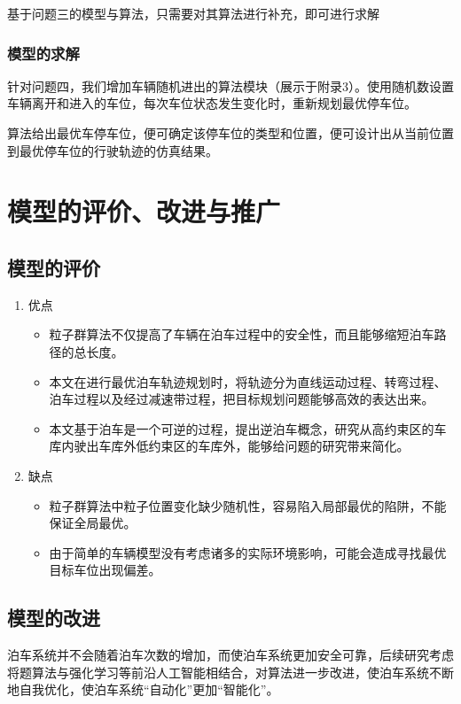 \documentclass{MathorCupmodeling}
\begin{document}
	基于问题三的模型与算法，只需要对其算法进行补充，即可进行求解
	
	\subsubsection{模型的求解}
	针对问题四，我们增加车辆随机进出的算法模块（展示于附录3）。使用随机数设置车辆离开和进入的车位，每次车位状态发生变化时，重新规划最优停车位。
	
	算法给出最优车停车位，便可确定该停车位的类型和位置，便可设计出从当前位置到最优停车位的行驶轨迹的仿真结果。

\section{模型的评价、改进与推广}
\subsection{模型的评价}
\begin{enumerate}
	\item 优点
	
	\begin{itemize}
		\item 粒子群算法不仅提高了车辆在泊车过程中的安全性，而且能够缩短泊车路径的总长度。
		\item 本文在进行最优泊车轨迹规划时，将轨迹分为直线运动过程、转弯过程、泊车过程以及经过减速带过程，把目标规划问题能够高效的表达出来。
		\item 本文基于泊车是一个可逆的过程，提出逆泊车概念，研究从高约束区的车库内驶出车库外低约束区的车库外，能够给问题的研究带来简化。
	\end{itemize}
	\item 缺点
	\begin{itemize}
		\item 粒子群算法中粒子位置变化缺少随机性，容易陷入局部最优的陷阱，不能保证全局最优。
		\item 由于简单的车辆模型没有考虑诸多的实际环境影响，可能会造成寻找最优目标车位出现偏差。
	\end{itemize}
\end{enumerate}


\subsection{模型的改进}

泊车系统并不会随着泊车次数的增加，而使泊车系统更加安全可靠，后续研究考虑将题算法与强化学习等前沿人工智能相结合，对算法进一步改进，使泊车系统不断地自我优化，使泊车系统“自动化”更加“智能化”。
\end{document}
